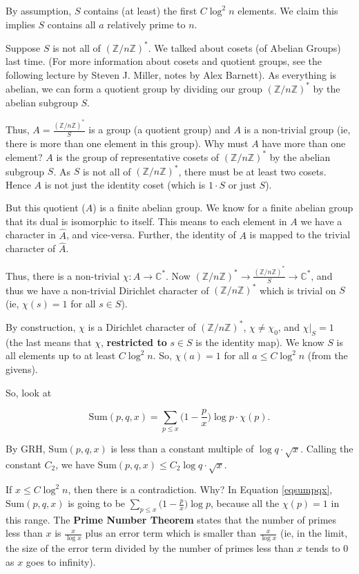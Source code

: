 \documentclass[12pt,letterpaper]{report}
\newcommand\be{\begin{equation}}
\newcommand\ee{\end{equation}}
\newcommand{\C}{\ensuremath{\mathbb{C}}}
\newcommand{\Z}{\ensuremath{\mathbb{Z}}}
\newcommand{\ZnZf}{ (\Z / n\Z)^{*}}
\begin{document}
By assumption, $S$ contains (at least) the first $C \log^2 n$
elements. We claim this implies $S$ contains all $a$ relatively
prime to $n$.

Suppose $S$ is not all of $\ZnZf$. We talked about cosets (of
Abelian Groups) last time. (For more information about cosets and
quotient groups, see the following lecture by Steven J. Miller,
notes by Alex Barnett). As everything is abelian, we can form a
quotient group by dividing our group $\ZnZf$ by the abelian
subgroup $S$.

Thus, $A = \frac{\ZnZf}{S}$ is a group (a quotient group) and $A$
is a non-trivial group (ie, there is more than one element in this
group). Why must $A$ have more than one element? $A$ is the group
of representative cosets of $\ZnZf$ by the abelian subgroup $S$.
As $S$ is not all of $\ZnZf$, there must be at least two cosets.
Hence $A$ is not just the identity coset (which is $1 \cdot S$ or
just $S$).

But this quotient ($A$) is a finite abelian group. We know for a
finite abelian group that its dual is isomorphic to itself. This
means to each element in $A$ we have a character in $\hat{A}$, and
vice-versa. Further, the identity of $A$ is mapped to the trivial
character of $\hat{A}$.

Thus, there is a non-trivial $\chi: A \rightarrow \C^{*}$. Now
$\ZnZf \rightarrow \frac{\ZnZf}{S} \rightarrow \C^{*}$, and thus
we have a non-trivial Dirichlet character of $\ZnZf$ which is
trivial on $S$ (ie, $\chi(s) = 1$ for all $s \in S$).

By construction, $\chi$ is a Dirichlet character of $\ZnZf$, $\chi
\neq \chi_0$, and $\chi|_S = 1$ (the last means that $\chi$,
\textbf{restricted to} $s \in S$ is the identity map). We know $S$
is all elements up to at least $C \log^2 n$. So, $\chi(a) = 1$ for
all $a \le C \log^2 n$ (from the givens).

So, look at

\be\label{eqsumpqx} \mbox{Sum}(p,q,x) = \sum_{p \le x} \Big(1 -
\frac{p}{x} \Big) \log p \cdot \chi(p). \ee

By GRH, $\mbox{Sum}(p,q,x)$ is less than a constant multiple of
$\log q \cdot \sqrt{x}$. Calling the constant $C_2$, we have
$\mbox{Sum}(p,q,x) \le C_2 \log q \cdot \sqrt{x}$.

If $x \le C \log^2 n$, then there is a contradiction. Why? In
Equation \ref{eqsumpqx}, $\mbox{Sum}(p,q,x)$ is going to be
$\sum_{p \le x} \Big(1 - \frac{p}{x} \Big) \log p$, because all
the $\chi(p) = 1$ in this range. The \textbf{Prime Number Theorem}
states that the number of primes less than $x$ is $\frac{x}{\log
x}$ plus an error term which is smaller than $\frac{x}{\log x}$
(ie, in the limit, the size of the error term divided by the
number of primes less than $x$ tends to $0$ as $x$ goes to
infinity).
\end{document}
